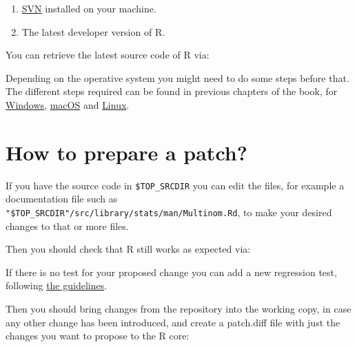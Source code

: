 \documentclass[
  letterpaper,
  DIV=11,
  numbers=noendperiod]{scrreprt}
\newenvironment{Shaded}{\begin{snugshade}}{\end{snugshade}}
\newcommand{\BuiltInTok}[1]{\textcolor[rgb]{0.00,0.23,0.31}{#1}}
\newcommand{\FunctionTok}[1]{\textcolor[rgb]{0.28,0.35,0.67}{#1}}
\newcommand{\NormalTok}[1]{\textcolor[rgb]{0.00,0.23,0.31}{#1}}
\newcommand{\OperatorTok}[1]{\textcolor[rgb]{0.37,0.37,0.37}{#1}}
\newcommand{\StringTok}[1]{\textcolor[rgb]{0.13,0.47,0.30}{#1}}
\newcommand{\VariableTok}[1]{\textcolor[rgb]{0.07,0.07,0.07}{#1}}
\begin{document}
\begin{enumerate}
\def\labelenumi{\arabic{enumi}.}
\item
  \href{http://subversion.apache.org/}{SVN} installed on your machine.
\item
  The latest developer version of R.
\end{enumerate}

You can retrieve the latest source code of R via:

\begin{Shaded}
\end{Shaded}

Depending on the operative system you might need to do some steps before
that. The different steps required can be found in previous chapters of
the book, for \hyperref[windowsSource]{Windows}, \hyperref[macos]{macOS}
and \hyperref[linux]{Linux}.

\section{How to prepare a patch?}\label{how-to-prepare-a-patch}

If you have the source code in \texttt{\$TOP\_SRCDIR} you can edit the
files, for example a documentation file such as
\texttt{"\$TOP\_SRCDIR"/src/library/stats/man/Multinom.Rd}, to make your
desired changes to that or more files.

Then you should check that R still works as expected via:

\begin{Shaded}
\end{Shaded}

If there is no test for your proposed change you can add a new
regression test, following \hyperref[TestRVer]{the guidelines}.

Then you should bring changes from the repository into the working copy,
in case any other change has been introduced, and create a patch.diff
file with just the changes you want to propose to the R core:
\end{document}
